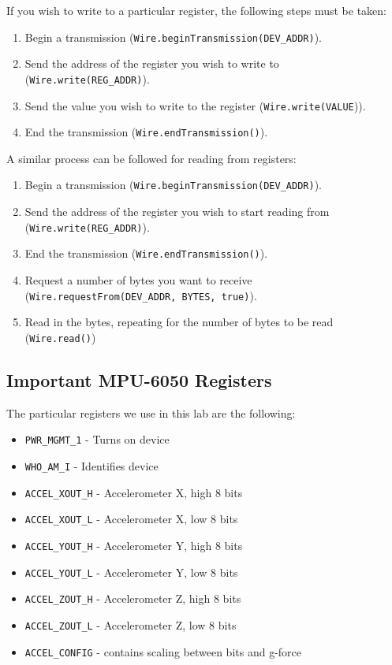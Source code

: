 \documentclass{article}
\begin{document}
        \noindent If you wish to write to a particular register, the following steps must be taken:
        \begin{enumerate}
            \item Begin a transmission (\texttt{Wire.beginTransmission(DEV\_ADDR)}).
            \item Send the address of the register you wish to write to (\texttt{Wire.write(REG\_ADDR)}).
            \item Send the value you wish to write to the register (\texttt{Wire.write(VALUE})).
            \item End the transmission (\texttt{Wire.endTransmission()}).
        \end{enumerate}
        \noindent A similar process can be followed for reading from registers:
        \begin{enumerate}
            \item Begin a transmission (\texttt{Wire.beginTransmission(DEV\_ADDR)}).
            \item Send the address of the register you wish to start reading from (\texttt{Wire.write(REG\_ADDR)}).
            \item End the transmission (\texttt{Wire.endTransmission()}).
            \item Request a number of bytes you want to receive (\texttt{Wire.requestFrom(DEV\_ADDR, BYTES, true)}).
            \item Read in the bytes, repeating for the number of bytes to be read (\texttt{Wire.read()})
        \end{enumerate}
    \subsection{Important MPU-6050 Registers}\label{registers}
        The particular registers we use in this lab are the following: 
        \begin{itemize}
            \item \texttt{PWR\_MGMT\_1} - Turns on device
            \item \texttt{WHO\_AM\_I} - Identifies device
            \item \texttt{ACCEL\_XOUT\_H} - Accelerometer X, high 8 bits 
            \item \texttt{ACCEL\_XOUT\_L} - Accelerometer X, low 8 bits 
            \item \texttt{ACCEL\_YOUT\_H} - Accelerometer Y, high 8 bits
            \item \texttt{ACCEL\_YOUT\_L} - Accelerometer Y, low 8 bits 
            \item \texttt{ACCEL\_ZOUT\_H} - Accelerometer Z, high 8 bits
            \item \texttt{ACCEL\_ZOUT\_L} - Accelerometer Z, low 8 bits 
            \item \texttt{ACCEL\_CONFIG} - contains scaling between bits and g-force
        \end{itemize}
        
\end{document}
